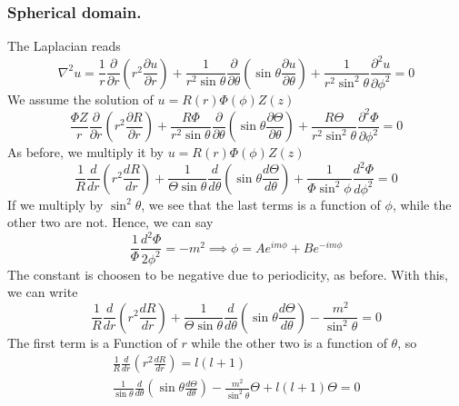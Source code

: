 \documentclass[../main.tex]{subfiles}
\begin{document}
\subsubsection*{Spherical domain.} The Laplacian reads 
\begin{equation*}
    \nabla^2u=\frac{1}{r}\frac{\partial}{\partial r}\left(r^2\frac{\partial u}{\partial r}\right) +\frac{1}{r^2\sin\theta}\frac{\partial}{\partial \theta}\left(\sin\theta \frac{\partial u}{\partial \theta}\right) +\frac{1}{r^2\sin^2\theta}\frac{\partial^2u}{\partial \phi^2}=0
\end{equation*}
We assume the solution of $u = R(r)\Phi(\phi)Z(z)$
\begin{equation*}
    \frac{\Phi Z}{r}\frac{\partial}{\partial r}\left(r^2\frac{\partial R}{\partial r}\right) +\frac{R\Phi}{r^2\sin\theta}\frac{\partial}{\partial \theta}\left(\sin\theta \frac{\partial \Theta}{\partial \theta}\right) +\frac{R\Theta}{r^2\sin^2\theta}\frac{\partial^2\Phi}{\partial \phi^2}=0
\end{equation*}
As before, we multiply it by $u = R(r)\Phi(\phi)Z(z)$
\begin{equation*}
    \frac{1}{R}\frac{d}{dr}\left(r^2\frac{dR}{dr}\right) +\frac{1}{\Theta\sin\theta}\frac{d}{d\theta}\left(\sin\theta\frac{d\Theta}{d\theta}\right) +\frac{1}{\Phi\sin^2\phi}\frac{d^2\Phi}{d\phi^2}=0
\end{equation*}
If we multiply by $\sin^2\theta$, we see that the last terms is a function of $\phi$, while the other two are not. Hence, we can say 
\begin{equation*}
    \frac{1}{\Phi}\frac{d^2\Phi}{2\phi^2}=-m^2\implies\phi=Ae^{im\phi}+ Be^{-im\phi}
\end{equation*}
The constant is choosen to be negative due to periodicity, as before. With this, we can write 
\begin{equation*}
    \frac{1}{R}\frac{d}{dr}\left(r^2\frac{dR}{dr}\right) +\frac{1}{\Theta\sin\theta}\frac{d}{d\theta}\left(\sin\theta\frac{d\Theta}{d\theta}\right) -\frac{m^2}{\sin^2\theta}=0
\end{equation*}
The first term is a Function of $r$ while the other two is a function of $\theta$, so 
\begin{gather*}
    \frac{1}{R}\frac{d}{dr}\left(r^2\frac{dR}{dr}\right) =l(l+1)\\
    \frac{1}{\sin\theta}\frac{d}{d\theta}\left(\sin\theta\frac{d\Theta}{d\theta}\right) -\frac{m^2}{\sin^2\theta}\Theta +l(l+1)\Theta =0
\end{gather*}
\end{document}
